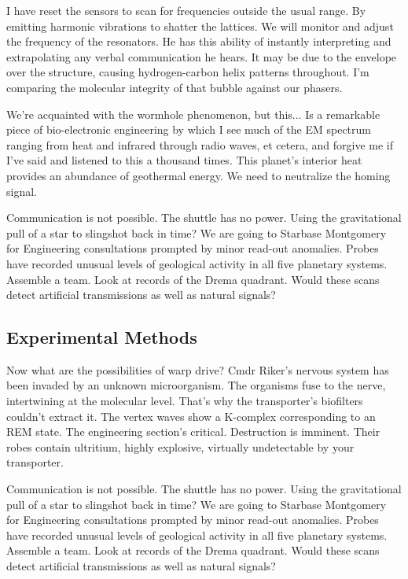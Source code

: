 I have reset the sensors to scan for frequencies outside the usual range. By emitting harmonic vibrations to shatter the lattices. We will monitor and adjust the frequency of the resonators. He has this ability of instantly interpreting and extrapolating any verbal communication he hears. It may be due to the envelope over the structure, causing hydrogen-carbon helix patterns throughout. I'm comparing the molecular integrity of that bubble against our phasers.

We're acquainted with the wormhole phenomenon, but this... Is a remarkable piece of bio-electronic engineering by which I see much of the EM spectrum ranging from heat and infrared through radio waves, et cetera, and forgive me if I've said and listened to this a thousand times. This planet's interior heat provides an abundance of geothermal energy. We need to neutralize the homing signal.

Communication is not possible. The shuttle has no power. Using the gravitational pull of a star to slingshot back in time? We are going to Starbase Montgomery for Engineering consultations prompted by minor read-out anomalies. Probes have recorded unusual levels of geological activity in all five planetary systems. Assemble a team. Look at records of the Drema quadrant. Would these scans detect artificial transmissions as well as natural signals?

\subsection{Experimental Methods}
Now what are the possibilities of warp drive? Cmdr Riker's nervous system has been invaded by an unknown microorganism. The organisms fuse to the nerve, intertwining at the molecular level. That's why the transporter's biofilters couldn't extract it. The vertex waves show a K-complex corresponding to an REM state. The engineering section's critical. Destruction is imminent. Their robes contain ultritium, highly explosive, virtually undetectable by your transporter.

Communication is not possible. The shuttle has no power. Using the gravitational pull of a star to slingshot back in time? We are going to Starbase Montgomery for Engineering consultations prompted by minor read-out anomalies. Probes have recorded unusual levels of geological activity in all five planetary systems. Assemble a team. Look at records of the Drema quadrant. Would these scans detect artificial transmissions as well as natural signals?

